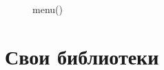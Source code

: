 \documentclass[12pt, a4paper]{article}
\begin{document}
\begin{figure}[H]
    \caption{menu()}
\end{figure}


\newpage
\section{Свои библиотеки}
\end{document}
